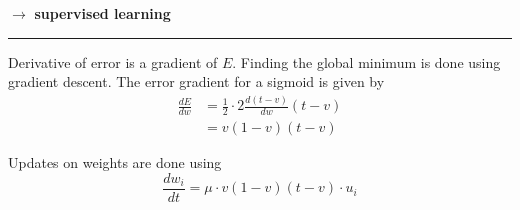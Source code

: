\documentclass[
    fontsize      = 11pt,
    paper         = a4,
    twoside       = false,
    parskip       = half,
    pagesize      = false,
]{scrartcl}
\begin{document}
\(\rightarrow\) \textbf{supervised learning}

\begin{center}\rule{0.5\linewidth}{0.5pt}\end{center}

Derivative of error is a gradient of \(E\). Finding the global minimum
is done using gradient descent. The error gradient for a sigmoid is
given by \begin{align*}
\frac{\mathit{d}E}{\mathit{d}w} &= \frac{1}{2}\cdot 2 \frac{\mathit{d}(t-v)}{\mathit{d}w}(t-v) \\[2ex]
&= v (1-v)(t-v)
\end{align*}

Updates on weights are done using
\[ \frac{\mathit{d}w_i}{\mathit{d}t} = \mu \cdot v(1-v) (t-v) \cdot u_i\]
\end{document}
